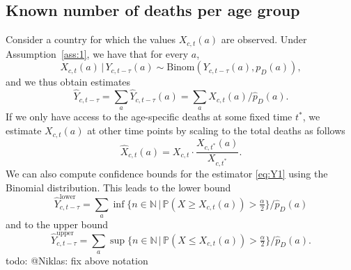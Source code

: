 \documentclass[a4paper]{article}
\newcommand\N{\mathbb{N}}
\newcommand\todo[1]{{\color{red}todo: #1}}
\renewcommand\P{\mathbb{P}}
\newcommand{\given}{\, \vert \,}
\newcommand\Rune[1]{{\color{blue}Rune: #1}}
\begin{document}
\subsection{Known number of deaths per age group} \label{sec:known}
%
Consider a country for which the values $X_{c,t}(a)$ are observed. 
Under Assumption~\ref{ass:1}, we have that for every $a$, 
$$X_{c,t}(a) \given Y_{c,t-\tau}(a) \sim \text{Binom}(Y_{c,t-\tau}(a), p_D(a)),$$
and we thus obtain estimates
\begin{equation}
  \label{eq:Y1}
  \hat{Y}_{c,t-\tau} = \sum_a \hat{Y}_{c,t-\tau}(a) =\sum_a
  X_{c,t}(a) / \hat  p_D(a).
\end{equation}
If we only have access to the age-specific deaths at some fixed time
$t^*$, we estimate $X_{c,t}(a)$ at other time points by scaling to the total deaths as follows
\begin{equation*}
  \hat{X}_{c,t}(a)=X_{c,t}\cdot\frac{X_{c,t^*}(a)}{X_{c,t^*}}.
\end{equation*}
We can also compute confidence bounds for the estimator \eqref{eq:Y1}
using the Binomial distribution. This leads to the lower bound
\begin{equation*}
  \hat{Y}_{c,t-\tau}^{\text{lower}} = \sum_a \inf\{n\in\N \,\vert\, \P(X\geq
  X_{c,t}(a))>\tfrac{\alpha}{2}\} / \hat  p_D(a)
\end{equation*}
and to the upper bound
\begin{equation*}
  \hat{Y}_{c,t-\tau}^{\text{upper}} = \sum_a \sup\{n\in\N \,\vert\, \P(X\leq
  X_{c,t}(a))>\tfrac{\alpha}{2}\} / \hat  p_D(a).
\end{equation*}
\todo{@Niklas: fix above notation}

\end{document}
